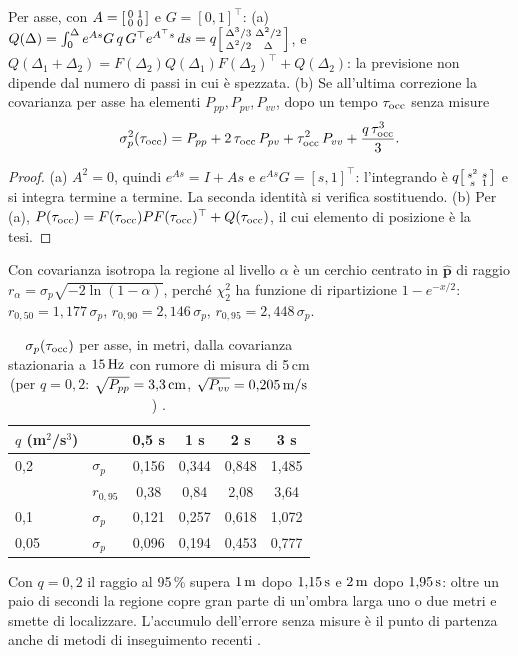 \begin{proposizione}\label{prop:sti-crescita}
Per asse, con $A=\begin{bsmallmatrix}0&1\\0&0\end{bsmallmatrix}$ e $G=[0,1]^{\top}$: (a) $Q(\Delta)=\int_0^{\Delta}e^{As}G\,q\,G^{\top}e^{A^{\top}s}\,ds=q\begin{bsmallmatrix}\Delta^3/3&\Delta^2/2\\\Delta^2/2&\Delta\end{bsmallmatrix}$, e $Q(\Delta_1+\Delta_2)=F(\Delta_2)Q(\Delta_1)F(\Delta_2)^{\top}+Q(\Delta_2)$: la previsione non dipende dal numero di passi in cui è spezzata. (b) Se all'ultima correzione la covarianza per asse ha elementi $P_{pp},P_{pv},P_{vv}$, dopo un tempo $\tau_{\mathrm{occ}}$ senza misure
\begin{equation}\label{eq:sti-crescita}
\sigma_p^2(\tau_{\mathrm{occ}})=P_{pp}+2\,\tau_{\mathrm{occ}}\,P_{pv}+\tau_{\mathrm{occ}}^2\,P_{vv}+\frac{q\,\tau_{\mathrm{occ}}^3}{3}.
\end{equation}
\end{proposizione}
\begin{proof}
(a) $A^2=0$, quindi $e^{As}=I+As$ e $e^{As}G=[s,1]^{\top}$: l'integrando è $q\begin{bsmallmatrix}s^2&s\\s&1\end{bsmallmatrix}$ e si integra termine a termine. La seconda identità si verifica sostituendo. (b) Per (a), $P(\tau_{\mathrm{occ}})=F(\tau_{\mathrm{occ}})PF(\tau_{\mathrm{occ}})^{\top}+Q(\tau_{\mathrm{occ}})$, il cui elemento di posizione è la tesi.
\end{proof}
Con covarianza isotropa la regione al livello $\alpha$ è un cerchio centrato in $\hat{\mathbf p}$ di raggio $r_\alpha=\sigma_p\sqrt{-2\ln(1-\alpha)}$, perché $\chi^2_2$ ha funzione di ripartizione $1-e^{-x/2}$: $r_{0,50}=1{,}177\,\sigma_p$, $r_{0,90}=2{,}146\,\sigma_p$, $r_{0,95}=2{,}448\,\sigma_p$.

\begin{table}[H]\centering\footnotesize
\caption{$\sigma_p(\tau_{\mathrm{occ}})$ per asse, in metri, dalla covarianza stazionaria a $15\,\mathrm{Hz}$ con rumore di misura di 5\,cm (per $q=0{,}2$: $\sqrt{P_{pp}}=3{,}3\,\mathrm{cm}$, $\sqrt{P_{vv}}=0{,}205\,\mathrm{m/s}$) .}\label{tab:sti-crescita}
\begin{tabular}{llcccc}
\toprule
$q$ (m$^2$/s$^3$) & & 0,5 s & 1 s & 2 s & 3 s\\
\midrule
0,2 & $\sigma_p$ & 0,156 & 0,344 & 0,848 & 1,485\\
 & $r_{0,95}$ & 0,38 & 0,84 & 2,08 & 3,64\\
0,1 & $\sigma_p$ & 0,121 & 0,257 & 0,618 & 1,072\\
0,05 & $\sigma_p$ & 0,096 & 0,194 & 0,453 & 0,777\\
\bottomrule
\end{tabular}
\end{table}
Con $q=0{,}2$ il raggio al 95\,\% supera $1\,\mathrm{m}$ dopo $1{,}15\,\mathrm{s}$ e $2\,\mathrm{m}$ dopo $1{,}95\,\mathrm{s}$: oltre un paio di secondi la regione copre gran parte di un'ombra larga uno o due metri e smette di localizzare. L'accumulo dell'errore senza misure è il punto di partenza anche di metodi di inseguimento recenti \cite{cao2023}.

